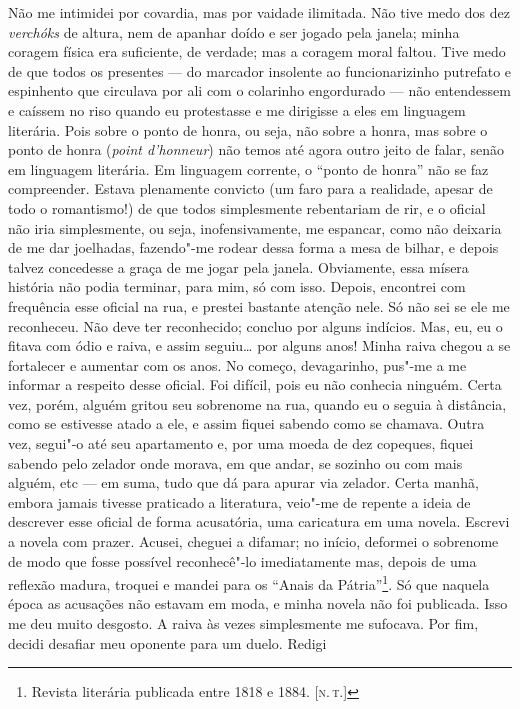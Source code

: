 Não me intimidei por covardia, mas por vaidade ilimitada. Não tive medo
dos dez \emph{verchóks} de altura, nem de apanhar doído e ser jogado
pela janela; minha coragem física era suficiente, de verdade; mas a
coragem moral faltou. Tive medo de que todos os presentes --- do marcador
insolente ao funcionarizinho putrefato e espinhento que circulava por
ali com o colarinho engordurado --- não entendessem e caíssem no riso
quando eu protestasse e me dirigisse a eles em linguagem literária. Pois
sobre o ponto de honra, ou seja, não sobre a honra, mas sobre o ponto de
honra (\emph{point d'honneur}) não temos até agora outro jeito de falar,
senão em linguagem literária. Em linguagem corrente, o ``ponto de
honra'' não se faz compreender. Estava plenamente convicto (um faro para
a realidade, apesar de todo o romantismo!) de que todos simplesmente
rebentariam de rir, e o oficial não iria simplesmente, ou seja,
inofensivamente, me espancar, como não deixaria de me dar joelhadas,
fazendo"-me rodear dessa forma a mesa de bilhar, e depois talvez
concedesse a graça de me jogar pela janela. Obviamente, essa mísera
história não podia terminar, para mim, só com isso. Depois, encontrei
com frequência esse oficial na rua, e prestei bastante atenção nele. Só
não sei se ele me reconheceu. Não deve ter reconhecido; concluo por
alguns indícios. Mas, eu, eu o fitava com ódio e raiva, e assim
seguiu\ldots{} por alguns anos! Minha raiva chegou a se fortalecer e aumentar
com os anos. No começo, devagarinho, pus"-me a me informar a respeito
desse oficial. Foi difícil, pois eu não conhecia ninguém. Certa vez,
porém, alguém gritou seu sobrenome na rua, quando eu o seguia à
distância, como se estivesse atado a ele, e assim fiquei sabendo como se
chamava. Outra vez, segui"-o até seu apartamento e, por uma moeda de dez
copeques, fiquei sabendo pelo zelador onde morava, em que andar, se
sozinho ou com mais alguém, etc --- em suma, tudo que dá para apurar via
zelador. Certa manhã, embora jamais tivesse praticado a literatura,
veio"-me de repente a ideia de descrever esse oficial de forma
acusatória, uma caricatura em uma novela. Escrevi a novela com prazer.
Acusei, cheguei a difamar; no início, deformei o sobrenome de modo que
fosse possível reconhecê"-lo imediatamente mas, depois de uma reflexão
madura, troquei e mandei para os ``Anais da Pátria''\footnote{Revista
  literária publicada entre 1818 e 1884. {[}\textsc{n.\,t.}{]}}. Só que naquela
época as acusações não estavam em moda, e minha novela não foi
publicada. Isso me deu muito desgosto. A raiva às vezes simplesmente me
sufocava. Por fim, decidi desafiar meu oponente para um duelo. Redigi
